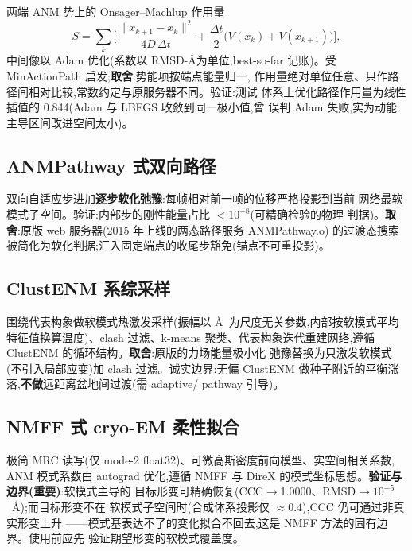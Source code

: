 \documentclass[11pt]{article}
\begin{document}
两端 ANM 势上的 Onsager--Machlup 作用量
\begin{equation}
S=\sum_k\Big[\frac{\lVert x_{k+1}-x_k\rVert^2}{4D\,\Delta t}
+\frac{\Delta t}{2}\big(V(x_k)+V(x_{k+1})\big)\Big],
\label{eq:action}
\end{equation}
中间像以 Adam 优化(系数以 RMSD-\AA 为单位,best-so-far 记账)。受
MinActionPath\cite{franklin2007} 启发;\textbf{取舍}:势能项按端点能量归一,
作用量绝对单位任意、只作路径间相对比较,常数约定与原服务器不同。验证:测试
体系上优化路径作用量为线性插值的 0.844(Adam 与 LBFGS 收敛到同一极小值,曾
误判 Adam 失败,实为动能主导区间改进空间太小)。

\subsection{ANMPathway 式双向路径}

双向自适应步进加\textbf{逐步软化弛豫}:每帧相对前一帧的位移严格投影到当前
网络最软模式子空间。验证:内部步的刚性能量占比 $<10^{-8}$(可精确检验的物理
判据)。\textbf{取舍}:原版 web 服务器(2015 年上线的两态路径服务 ANMPathway.o)
的过渡态搜索被简化为软化判据;汇入固定端点的收尾步豁免(锚点不可重投影)。

\subsection{ClustENM 系综采样}

围绕代表构象做软模式热激发采样(振幅以 \AA\ 为尺度无关参数,内部按软模式平均
特征值换算温度)、clash 过滤、k-means 聚类、代表构象迭代重建网络,遵循
ClustENM\cite{kurkcuoglu2016} 的循环结构。\textbf{取舍}:原版的力场能量极小化
弛豫替换为只激发软模式(不引入局部应变)加 clash 过滤。诚实边界:无偏
ClustENM 做种子附近的平衡涨落,\textbf{不做}远距离盆地间过渡(需 adaptive/
pathway 引导)。

\subsection{NMFF 式 cryo-EM 柔性拟合}

极简 MRC 读写(仅 mode-2 float32)、可微高斯密度前向模型、实空间相关系数,
ANM 模式系数由 autograd 优化,遵循 NMFF\cite{tama2004} 与 DireX
\cite{schroder2007} 的模式坐标思想。\textbf{验证与边界(重要)}:软模式主导的
目标形变可精确恢复(CCC$\to$1.0000、RMSD$\to10^{-5}$~\AA);而目标形变不在
软模式子空间时(合成体系投影仅 $\approx0.4$),CCC 仍可通过非真实形变上升
——模式基表达不了的变化拟合不回去,这是 NMFF 方法的固有边界。使用前应先
验证期望形变的软模式覆盖度。
\end{document}
